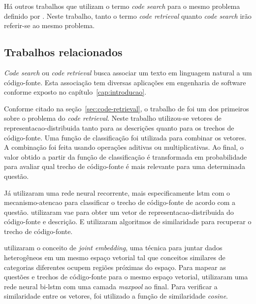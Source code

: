 Há outros trabalhos \citep{Gu-deep-code-search:2018, Sachdev-neural-code-search:2018, cambronero-deep-learning-code-search:2019} que utilizam o termo \textit{code search} para o mesmo problema definido por \cite{iyer-etal-2016-summarizing}. Neste trabalho, tanto o termo \textit{code retrieval} quanto \textit{code search} irão referir-se ao mesmo problema.

\subsection{Trabalhos relacionados}\label{sec:code-retrieval-trabalhos-relacionados}

\textit{Code search} ou \textit{code retrieval} busca associar um texto em linguagem natural a um código-fonte. Esta associação tem diversas aplicações em engenharia de software conforme exposto no capítulo~\ref{cap:introducao}.

Conforme citado na seção~\ref{sec:code-retrieval}, o trabalho de \cite{Allamanis-bimodal-source-code-natural-language:2015} foi um dos primeiros sobre o problema do \textit{code retrieval}. Neste trabalho utilizou-se vetores de \gls{representacao-distribuida} tanto para as descrições quanto para os trechos de código-fonte. Uma função de classificação foi utilizada para combinar os vetores. A combinação foi feita usando operações aditivas ou multiplicativas. Ao final, o valor obtido a partir da função de classificação é transformada em probabilidade para avaliar qual trecho de código-fonte é mais relevante para uma determinada questão.

Já \cite{iyer-etal-2016-summarizing} utilizaram uma rede neural recorrente, mais especificamente \acrshort{lstm} com o \gls{mecanismo-atencao} para classificar o trecho de código-fonte de acordo com a questão. \cite{Chen-bi-variational-autoencoder:2018} utilizaram \acrfull{vae} para obter um vetor de \gls{representacao-distribuida} do código-fonte e descrição. E utilizaram algoritmos de similaridade para recuperar o trecho de código-fonte.

\cite{Gu-deep-code-search:2018} utilizaram o conceito de \textit{joint embedding}, uma técnica para juntar dados heterogêneos em um mesmo espaço vetorial tal que conceitos similares de categorias diferentes ocupem regiões próximas do espaço. Para mapear as questões e trechos de código-fonte para o mesmo espaço vetorial, \cite{Gu-deep-code-search:2018} utilizaram uma rede neural bi-\acrshort{lstm} com uma camada \textit{maxpool} ao final. Para verificar a similaridade entre os vetores, foi utilizado a função de similaridade \textit{cosine}.

